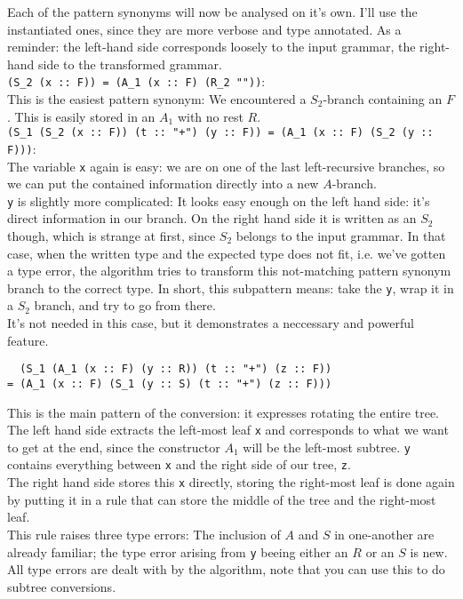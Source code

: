 \documentclass[a4paper]{article}
\begin{document}
Each of the pattern synonyms will now be analysed on it's own. I'll use the instantiated ones, since they are more verbose and type annotated.
As a reminder: the left-hand side corresponds loosely to the input grammar, the right-hand side to the transformed grammar.\\
\verb|(S_2 (x :: F)) = (A_1 (x :: F) (R_2 ""))|:\\
This is the easiest pattern synonym: We encountered a $S_2$-branch containing an $F$. This is easily stored in an $A_1$ with no rest $R$.\\

\verb|(S_1 (S_2 (x :: F)) (t :: "+") (y :: F)) = (A_1 (x :: F) (S_2 (y :: F)))|:\\
The variable \verb|x| again is easy: we are on one of the last left-recursive branches, so we can put the contained information directly into a new $A$-branch.\\
\verb|y| is slightly more complicated: It looks easy enough on the left hand side: it's direct information in our branch. On the right hand side it is written as an $S_2$ though, which is strange at first, since $S_2$ belongs to the input grammar.
In that case, when the written type and the expected type does not fit, i.e. we've gotten a type error, the algorithm tries to transform this not-matching pattern synonym branch to the correct type. In short, this subpattern means: take the \verb|y|, wrap it in a $S_2$ branch, and try to go from there.\\
It's not needed in this case, but it demonstrates a neccessary and powerful feature. %
%
\begin{verbatim}
  (S_1 (A_1 (x :: F) (y :: R)) (t :: "+") (z :: F)) 
= (A_1 (x :: F) (S_1 (y :: S) (t :: "+") (z :: F)))
\end{verbatim}
This is the main pattern of the conversion: it expresses rotating the entire tree.\\
The left hand side extracts the left-most leaf \verb|x| and corresponds to what we want to get at the end, since the constructor $A_1$ will be the left-most subtree. \verb|y| contains everything between \verb|x| and the right side of our tree, \verb|z|.\\
The right hand side stores this \verb|x| directly, storing the right-most leaf is done again by putting it in a rule that can store the middle of the tree and the right-most leaf.\\
This rule raises three type errors: The inclusion of $A$ and $S$ in one-another are already familiar; the type error arising from \verb|y| beeing either an $R$ or an $S$ is new. All type errors are dealt with by the algorithm, note that you can use this to do subtree conversions.\\
\end{document}
